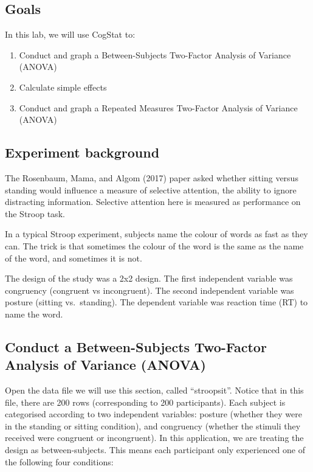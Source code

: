 \documentclass[
]{book}
\begin{document}
\hypertarget{goals-9}{%
\subsection{Goals}\label{goals-9}}

In this lab, we will use CogStat to:

\begin{enumerate}
\def\labelenumi{\arabic{enumi}.}
\item
  Conduct and graph a Between-Subjects Two-Factor Analysis of Variance (ANOVA)
\item
  Calculate simple effects
\item
  Conduct and graph a Repeated Measures Two-Factor Analysis of Variance (ANOVA)
\end{enumerate}

\hypertarget{experiment-background-9}{%
\subsection{Experiment background}\label{experiment-background-9}}

The Rosenbaum, Mama, and Algom (2017) paper asked whether sitting versus standing would influence a measure of selective attention, the ability to ignore distracting information. Selective attention here is measured as performance on the Stroop task.

In a typical Stroop experiment, subjects name the colour of words as fast as they can. The trick is that sometimes the colour of the word is the same as the name of the word, and sometimes it is not.

The design of the study was a 2x2 design. The first independent variable was congruency (congruent vs incongruent). The second independent variable was posture (sitting vs.~standing). The dependent variable was reaction time (RT) to name the word.

\hypertarget{conduct-a-between-subjects-two-factor-analysis-of-variance-anova-1}{%
\subsection{Conduct a Between-Subjects Two-Factor Analysis of Variance (ANOVA)}\label{conduct-a-between-subjects-two-factor-analysis-of-variance-anova-1}}

Open the data file we will use this section, called ``stroopsit''. Notice that in this file, there are 200 rows (corresponding to 200 participants). Each subject is categorised according to two independent variables: posture (whether they were in the standing or sitting condition), and congruency (whether the stimuli they received were congruent or incongruent). In this application, we are treating the design as between-subjects. This means each participant only experienced one of the following four conditions:
\end{document}
